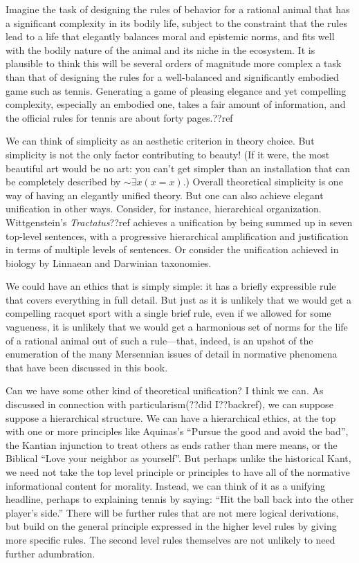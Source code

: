 Imagine the task of designing the rules of behavior for a rational animal that has a significant complexity in its bodily
life, subject to the constraint that the rules lead to a life that elegantly balances moral and epistemic norms, and fits
well with the bodily nature of the animal and its niche in the ecosystem. It is plausible to think this will be several
orders of magnitude more complex a task than that of designing the rules for a well-balanced and significantly embodied game 
such as tennis. Generating a game of pleasing elegance and yet compelling complexity, especially an embodied one, takes a 
fair amount of information, and the official rules for tennis are about forty pages.??ref 

We can think of simplicity as an aesthetic criterion in theory choice. But simplicity is not the only factor contributing
to beauty! (If it were, the most beautiful art would be no art: you can't get simpler than an installation that can be 
completely described by $\sim\exists x(x=x)$.) Overall theoretical simplicity is one way of having an elegantly unified
theory. But one can also achieve elegant unification in other ways. Consider, for instance, hierarchical organization. Wittgenstein's
\textit{Tractatus}??ref achieves a unification by being summed up in seven top-level sentences, with a progressive hierarchical
amplification and justification in terms of multiple levels of sentences. Or consider the unification achieved in biology by
Linnaean and Darwinian taxonomies.

We could have an ethics that is simply simple: it has a briefly expressible rule that covers everything in full detail. But 
just as it is unlikely that we would get a compelling racquet sport with a single brief rule, even if we allowed for some
vagueness, it is unlikely that we would get a harmonious set of norms for the life of a rational animal out of such a rule---that, 
indeed, is an upshot of the enumeration of the many Mersennian issues of detail in normative phenomena that have been discussed
in this book. 

Can we have some other kind of theoretical unification? I think we can. As discussed in connection with particularism(??did I??backref),
we can suppose suppose a hierarchical structure. We can have a hierarchical ethics, at the top with one or more principles like Aquinas's ``Pursue the good
and avoid the bad'', the Kantian injunction to treat others as ends rather than mere means, or the Biblical ``Love your neighbor as yourself''.
But perhaps unlike the historical Kant, we need not take the top level principle or principles to have all of the normative informational 
content for morality. Instead, we can think of it as a unifying headline, perhaps to explaining tennis by saying: ``Hit the ball back into the
other player's side.'' There will be further rules that are not mere logical derivations, but build on the general principle expressed in 
the higher level rules by giving more specific rules. The second level rules themselves are not unlikely to need further adumbration.

